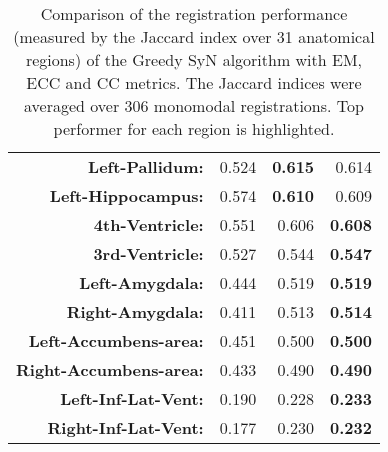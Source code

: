 \begin{table}[htbp]
{\begin{tabular}{rrrr}
    \textbf{Left-Pallidum:} & 0.524 & \textbf{0.615} & 0.614 \\
    \textbf{Left-Hippocampus:} & 0.574 & \textbf{0.610} & 0.609 \\
    \textbf{4th-Ventricle:} & 0.551 & 0.606 & \textbf{0.608} \\
    \textbf{3rd-Ventricle:} & 0.527 & 0.544 & \textbf{0.547} \\
    \textbf{Left-Amygdala:} & 0.444 & 0.519 & \textbf{0.519} \\
    \textbf{Right-Amygdala:} & 0.411 & 0.513 & \textbf{0.514} \\
    \textbf{Left-Accumbens-area:} & 0.451 & 0.500 & \textbf{0.500} \\
    \textbf{Right-Accumbens-area:} & 0.433 & 0.490 & \textbf{0.490} \\
    \textbf{Left-Inf-Lat-Vent:} & 0.190 & 0.228 & \textbf{0.233} \\
    \textbf{Right-Inf-Lat-Vent:} & 0.177 & 0.230 & \textbf{0.232} \\
    \bottomrule
    \end{tabular}}%
    \caption{Comparison of the registration performance (measured by the Jaccard index over 31 anatomical regions) of the Greedy SyN algorithm with EM, ECC and CC metrics. The Jaccard
indices were averaged over 306 monomodal registrations. Top performer for each region is highlighted.}
  \label{tab:monomodal_results_seg}%
\end{table}%
